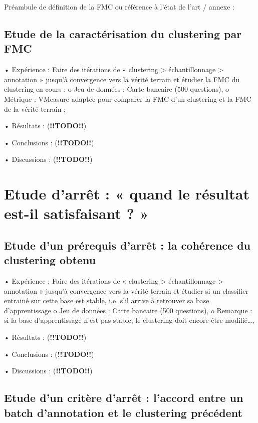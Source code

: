         Préambule de définition de la FMC ou référence à l’état de l’art / annexe :

        \subsection{Etude de la caractérisation du clustering par FMC}

        •	Expérience : Faire des itérations de « clustering > échantillonnage > annotation » jusqu’à convergence vers la vérité terrain et étudier la FMC du clustering en cours :
            o	Jeu de données : Carte bancaire (500 questions),
            o	Métrique : VMeasure adaptée pour comparer la FMC d’un clustering et la FMC de la vérité terrain ;

        •	Résultats : (\textbf{!!TODO!!})

        •	Conclusions : (\textbf{!!TODO!!})

        •	Discussions : (\textbf{!!TODO!!})


    \section{Etude d’arrêt : « quand le résultat est-il satisfaisant ? »}
        
        \subsection{Etude d’un prérequis d’arrêt : la cohérence du clustering obtenu}

        •	Expérience : Faire des itérations de « clustering > échantillonnage > annotation » jusqu’à convergence vers la vérité terrain et étudier si un classifier entrainé sur cette base est stable, i.e. s’il arrive à retrouver sa base d’apprentissage 
            o	Jeu de données : Carte bancaire (500 questions),
            o	Remarque : si la base d’apprentissage n’est pas stable, le clustering doit encore être modifié…,

        •	Résultats : (\textbf{!!TODO!!})

        •	Conclusions : (\textbf{!!TODO!!})

        •	Discussions : (\textbf{!!TODO!!})


        \subsection{Etude d’un critère d’arrêt : l’accord entre un batch d’annotation et le clustering précédent}

